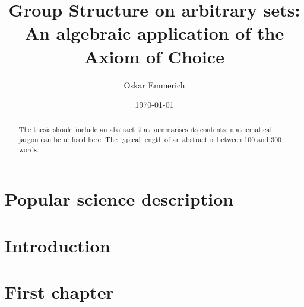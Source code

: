 \documentclass[a4paper,12pt]{memoir}
\numberwithin{equation}{section} %
\theoremstyle{theorem}
\theoremstyle{definition} %
\theoremstyle{remark} %
\begin{document}

\author{Oskar Emmerich}

\title{Group Structure on arbitrary sets:\\An algebraic application of the Axiom of Choice}

\date{\today}



\frontmatter %


\thispagestyle{empty}

\begin{abstract}
  The thesis should include an abstract that summarises its contents;
  mathematical jargon can be utilised here. The typical length of an abstract is
  between 100 and 300 words.
\end{abstract}



\chapter*{Popular science description}




\cleardoublepage

\tableofcontents*



\chapter*{Introduction}




\mainmatter %

\chapter{First chapter}



\appendix %


\backmatter





\end{document}
